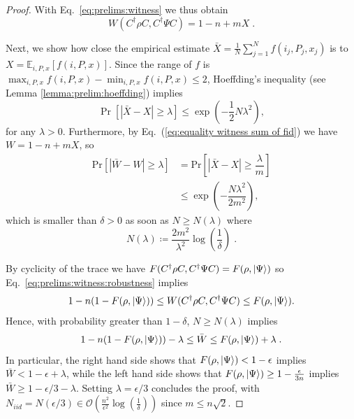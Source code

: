 \documentclass[a4paper,twocolumn,11pt,unpublished]{quantumarticle}
\newcommand{\np}{m}
\begin{document}
\begin{proof}
        With Eq.~\eqref{eq:prelims:witness} we thus obtain 
        \begin{equation}
            \label{eq:equality witness sum of fid}
            W(C^\dagger\rho C,C^\dagger\Psi C) = 1-n+\np X\; .
        \end{equation}

        Next, we show how close the empirical estimate $\bar X=\frac1N\sum_{j=1}^Nf(i_j,P_j,x_j)$ is to $X=\mathbb E_{i,P,x}[f(i,P,x)]$. Since the range of $f$ is $\max_{i,P,x}f(i,P,x)-\min_{i,P,x}f(i,P,x)\leq2$, Hoeffding's inequality (see Lemma \ref{lemma:prelim:hoeffding}) implies
        \begin{equation}
            \Pr[
            |\bar X - X| \geq \lambda
            ] \leq \exp
            \left(
            -\frac12N\lambda^2
            \right),
        \end{equation}
        for any $\lambda>0$.
        Furthermore, by Eq.\ (\ref{eq:equality witness sum of fid}) we have $W=1-n +\np X$, so
        \begin{equation}
            \begin{aligned}
            \mathrm{Pr}[
            |\bar W - W| \geq \lambda
            ] &= 
            \mathrm{Pr}\left[
            |\bar X - X| \geq \dfrac{\lambda}{\np}
            \right] \\
            &\leq
            \exp{
            \left(
            -\dfrac{N \lambda^2}{2\np^2}
            \right)
            },
            \end{aligned}
        \end{equation}
        which is smaller than $\delta>0$ as soon as $N\ge N(\lambda)$ where
            \begin{equation}
                N(\lambda)\coloneqq\frac{2\np^2}{\lambda^2}\log\left(\dfrac{1}{\delta}\right)\; .
            \end{equation}
 
        By cyclicity of the trace we have $F(C^\dagger\rho C,C^\dagger\Psi C)=F(\rho,\ket\Psi)$ so Eq.~\eqref{eq:prelims:witness:robustness} implies
        \begin{equation}
            1-n(1-F(\rho,\ket\Psi)) \leq W(C^\dagger\rho C,C^\dagger\Psi C) \leq F(\rho,\ket\Psi).
        \end{equation}
        Hence, with probability greater than $1-\delta$, $N\ge N(\lambda)$ implies
        \begin{equation}
            1-n(1-F(\rho, \ket\Psi)) -\lambda \leq \bar W \leq F(\rho, \ket\Psi) + \lambda\; .
        \end{equation}
        In particular, the right hand side shows that $F(\rho,\ket\Psi)<1-\epsilon$ implies $\bar W<1-\epsilon+\lambda$, while the left hand side shows that $F(\rho,\ket\Psi)\ge1-\frac\epsilon{3n}$ implies $\bar W\ge1-\epsilon/3-\lambda$. Setting $\lambda=\epsilon/3$ concludes the proof, with $N_{iid}=N(\epsilon/3)\in\mathcal O(\frac{n^2}{\epsilon^2}\log(\frac{1}{\delta}))$ since $m\le n\sqrt2$.
        \end{proof}
\end{document}
